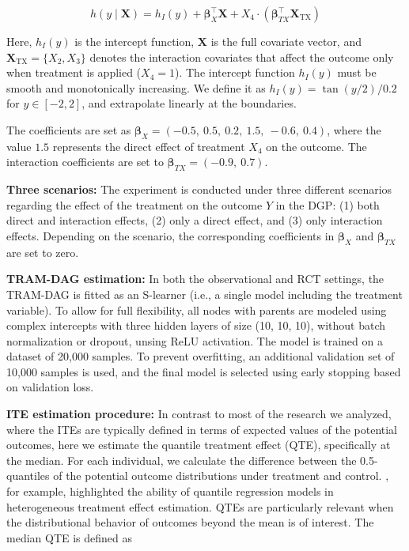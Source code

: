 \begin{equation}
h(y \mid \mathbf{X}) = h_I(y) + \boldsymbol{\beta}_X^\top \mathbf{X} + X_4 \cdot (\boldsymbol{\beta}_{TX}^\top \mathbf{X}_{\text{TX}})
\label{eq:outcome_dgp}
\end{equation}

Here, $h_I(y)$ is the intercept function, $\mathbf{X}$ is the full covariate vector, and $\mathbf{X}_{\text{TX}} = \{X_2, X_3\}$ denotes the interaction covariates that affect the outcome only when treatment is applied ($X_4 = 1$). The intercept function $h_I(y)$ must be smooth and monotonically increasing. We define it as $h_I(y) = \tan(y/2) / 0.2$ for $y \in [-2, 2]$, and extrapolate linearly at the boundaries.

The coefficients are set as $\boldsymbol{\beta}_X = (-0.5,\ 0.5,\ 0.2,\ 1.5,\ -0.6,\ 0.4)$, where the value $1.5$ represents the direct effect of treatment $X_4$ on the outcome. The interaction coefficients are set to $\boldsymbol{\beta}_{TX} = (-0.9,\ 0.7)$.

\vspace{5mm} %

\textbf{Three scenarios:} The experiment is conducted under three different scenarios regarding the effect of the treatment on the outcome $Y$ in the DGP: (1) both direct and interaction effects, (2) only a direct effect, and (3) only interaction effects. Depending on the scenario, the corresponding coefficients in $\boldsymbol{\beta}_X$ and $\boldsymbol{\beta}_{TX}$ are set to zero.

\vspace{5mm} %


\textbf{TRAM-DAG estimation:} In both the observational and RCT settings, the TRAM-DAG is fitted as an S-learner (i.e., a single model including the treatment variable). To allow for full flexibility, all nodes with parents are modeled using complex intercepts with three hidden layers of size (10, 10, 10), without batch normalization or dropout, unsing ReLU activation. The model is trained on a dataset of 20,000 samples. To prevent overfitting, an additional validation set of 10,000 samples is used, and the final model is selected using early stopping based on validation loss.

\vspace{5mm} %

\textbf{ITE estimation procedure:} In contrast to most of the research we analyzed, where the ITEs are typically defined in terms of expected values of the potential outcomes, here we estimate the quantile treatment effect (QTE), specifically at the median. For each individual, we calculate the difference between the 0.5-quantiles of the potential outcome distributions under treatment and control. \citet{chernozhukov2005}, for example, highlighted the ability of quantile regression models in heterogeneous treatment effect estimation. QTEs are particularly relevant when the distributional behavior of outcomes beyond the mean is of interest. The median QTE is defined as

